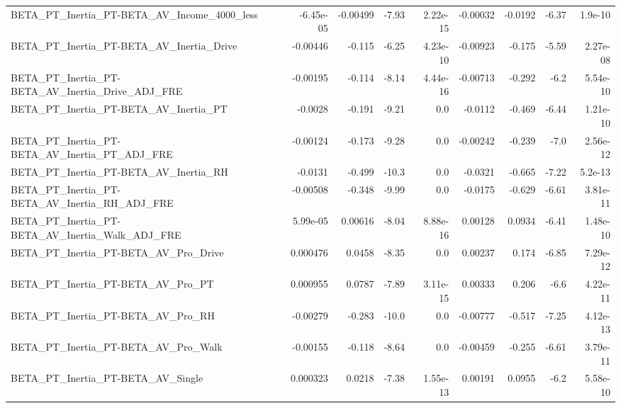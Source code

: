 \begin{tabular}{lrrrrrrrr}
BETA\_PT\_Inertia\_PT-BETA\_AV\_Income\_4000\_less        &   -6.45e-05 &     -0.00499 &    -7.93 & 2.22e-15 &   -0.00032 &     -0.0192 &        -6.37 &       1.9e-10 \\
BETA\_PT\_Inertia\_PT-BETA\_AV\_Inertia\_Drive           &    -0.00446 &       -0.115 &    -6.25 & 4.23e-10 &   -0.00923 &      -0.175 &        -5.59 &      2.27e-08 \\
BETA\_PT\_Inertia\_PT-BETA\_AV\_Inertia\_Drive\_ADJ\_FRE   &    -0.00195 &       -0.114 &    -8.14 & 4.44e-16 &   -0.00713 &      -0.292 &         -6.2 &      5.54e-10 \\
BETA\_PT\_Inertia\_PT-BETA\_AV\_Inertia\_PT              &     -0.0028 &       -0.191 &    -9.21 &      0.0 &    -0.0112 &      -0.469 &        -6.44 &      1.21e-10 \\
BETA\_PT\_Inertia\_PT-BETA\_AV\_Inertia\_PT\_ADJ\_FRE      &    -0.00124 &       -0.173 &    -9.28 &      0.0 &   -0.00242 &      -0.239 &         -7.0 &      2.56e-12 \\
BETA\_PT\_Inertia\_PT-BETA\_AV\_Inertia\_RH              &     -0.0131 &       -0.499 &    -10.3 &      0.0 &    -0.0321 &      -0.665 &        -7.22 &       5.2e-13 \\
BETA\_PT\_Inertia\_PT-BETA\_AV\_Inertia\_RH\_ADJ\_FRE      &    -0.00508 &       -0.348 &    -9.99 &      0.0 &    -0.0175 &      -0.629 &        -6.61 &      3.81e-11 \\
BETA\_PT\_Inertia\_PT-BETA\_AV\_Inertia\_Walk\_ADJ\_FRE    &    5.99e-05 &      0.00616 &    -8.04 & 8.88e-16 &    0.00128 &      0.0934 &        -6.41 &      1.48e-10 \\
BETA\_PT\_Inertia\_PT-BETA\_AV\_Pro\_Drive               &    0.000476 &       0.0458 &    -8.35 &      0.0 &    0.00237 &       0.174 &        -6.85 &      7.29e-12 \\
BETA\_PT\_Inertia\_PT-BETA\_AV\_Pro\_PT                  &    0.000955 &       0.0787 &    -7.89 & 3.11e-15 &    0.00333 &       0.206 &         -6.6 &      4.22e-11 \\
BETA\_PT\_Inertia\_PT-BETA\_AV\_Pro\_RH                  &    -0.00279 &       -0.283 &    -10.0 &      0.0 &   -0.00777 &      -0.517 &        -7.25 &      4.12e-13 \\
BETA\_PT\_Inertia\_PT-BETA\_AV\_Pro\_Walk                &    -0.00155 &       -0.118 &    -8.64 &      0.0 &   -0.00459 &      -0.255 &        -6.61 &      3.79e-11 \\
BETA\_PT\_Inertia\_PT-BETA\_AV\_Single                  &    0.000323 &       0.0218 &    -7.38 & 1.55e-13 &    0.00191 &      0.0955 &         -6.2 &      5.58e-10 \\

\end{tabular}
